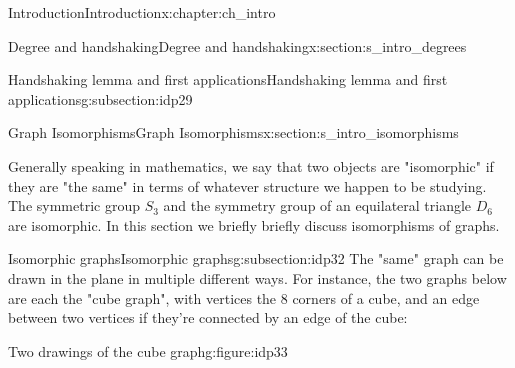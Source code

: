 \documentclass[oneside,10pt,]{book}
\numberwithin{equation}{section}
\begin{document}
\begin{chapterptx}{Introduction}{}{Introduction}{}{}{x:chapter:ch_intro}
\begin{sectionptx}{Degree and handshaking}{}{Degree and handshaking}{}{}{x:section:s_intro_degrees}
\begin{subsectionptx}{Handshaking lemma and first applications}{}{Handshaking lemma and first applications}{}{}{g:subsection:idp29}
\end{subsectionptx}
\end{sectionptx}
%
%
\typeout{************************************************}
\typeout{************************************************}
%
\begin{sectionptx}{Graph Isomorphisms}{}{Graph Isomorphisms}{}{}{x:section:s_intro_isomorphisms}
\begin{introduction}{}%
Generally speaking in mathematics, we say that two objects are "isomorphic" if they are "the same" in terms of whatever structure we happen to be studying.  The symmetric group \(S_3\) and the symmetry group of an equilateral triangle \(D_6\) are isomorphic.  In this section we briefly briefly discuss isomorphisms of graphs.%
\end{introduction}%
%
%
\typeout{************************************************}
\typeout{************************************************}
%
\begin{subsectionptx}{Isomorphic graphs}{}{Isomorphic graphs}{}{}{g:subsection:idp32}
The "same" graph can be drawn in the plane in multiple different ways.  For instance, the two graphs below are each the "cube graph", with vertices the 8 corners of a cube, and an edge between two vertices if they're connected by an edge of the cube:%
\begin{figureptx}{Two drawings of the cube graph}{g:figure:idp33}{}%
\begin{image}{0.05}{0.9}{0.05}%
\end{image}
\end{figureptx}
\end{subsectionptx}
\end{sectionptx}
\end{chapterptx}
\end{document}
